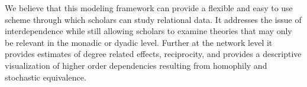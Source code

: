 We believe that this modeling framework can provide a flexible and easy to use scheme through which scholars can study relational data. It addresses the issue of interdependence while still allowing scholars to examine theories that may only be relevant in the monadic or dyadic level. Further at the network level it provides estimates of degree related effects, reciprocity, and provides a descriptive visualization of higher order dependencies resulting from homophily and stochastic equivalence. 



